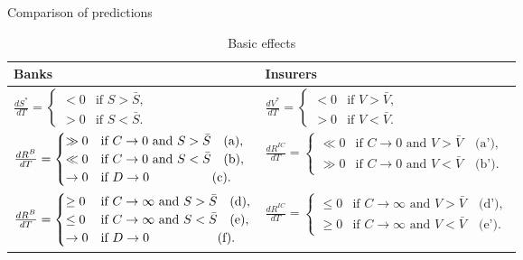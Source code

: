 \begin{table}[h!]
\centering
\caption{Comparison of predictions} \label{tab:predictions_compare}
\scriptsize
    \begin{subtable}{\textwidth}
        \captionsetup{justification=raggedright, singlelinecheck=false,font=small}
        \caption{Basic effects} \label{tab:basic_effect}
        \renewcommand{\arraystretch}{2}
        \scriptsize
        \begin{tabular}{|p{7cm}|p{7cm}|}
            \hline 
            \textbf{Banks} & \textbf{Insurers} \\ \hline
            $\frac{dS^*}{dT}=\begin{cases}
                < 0 & \text{if } S > \bar{S}, \\ 
                > 0 & \text{if } S < \bar{S}.
            \end{cases}$ 
            & $\frac{dV^*}{dT}= \begin{cases}
                < 0 & \text{if } V > \bar{V}, \\ 
                > 0 & \text{if } V < \bar{V}.
            \end{cases}$ \\ \hline 
            $\frac{dR^B}{dT}=\begin{cases} 
                \gg 0 & \text{if } C \to 0 \text{ and } S > \bar{S} \quad \text{(a)}, \\ 
                \ll 0 &\text{if } C \to 0 \text{ and } S < \bar{S} \quad \text{(b)}\label{eq:b}, \\ 
                \to 0 & \text{if } D \to 0 \hspace{1.75cm}
                \text{(c)}.
                \end{cases}$ 
            & $\frac{dR^{IC}}{dT}=\begin{cases} 
                \ll 0 & \text{if } C \to 0 \text{ and } V > \bar{V} \quad \text{(a')}, \\ 
                \gg 0 & \text{if } C \to 0 \text{ and } V < \bar{V} \quad \text{(b')}.
            \end{cases}$ \\ \hline
            $\frac{dR^B}{dT}=\begin{cases} 
                \geq 0 & \text{if } C \to \infty \text{ and } S > \bar{S} \quad \text{(d)}, \\ 
                \leq 0 & \text{if } C \to \infty \text{ and } S < \bar{S} \quad \text{(e)}, \\ 
                \to 0 & \text{if } D \to 0 \hspace{1.9cm} \text{(f)}.
            \end{cases}$ 
            & $\frac{dR^{IC}}{dT}=\begin{cases} 
                \leq 0 & \text{if } C \to \infty \text{ and } V > \bar{V} \quad \text{(d')}, \\ 
                \geq 0 & \text{if } C \to \infty \text{ and } V < \bar{V} \quad \text{(e')}.
            \end{cases}$ \\ \hline 
        \end{tabular}
    \end{subtable}
    

\end{table}
